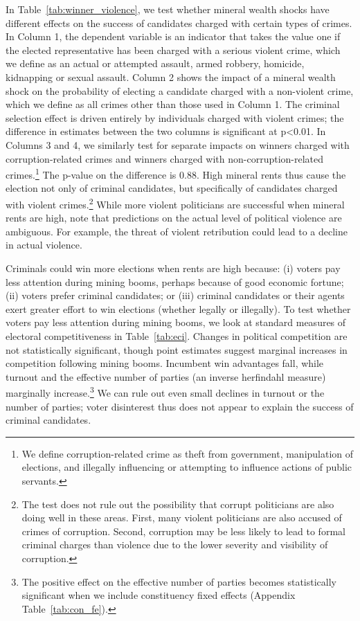 \documentclass[12pt,letterpaper]{article}
\begin{document}
In Table~\ref{tab:winner_violence}, we test whether mineral wealth
shocks have different effects on the success of candidates charged
with certain types of crimes. In Column 1, the dependent variable is
an indicator that takes the value one if the elected representative
has been charged with a serious violent crime, which we define as an
actual or attempted assault, armed robbery, homicide, kidnapping or
sexual assault. Column 2 shows the impact of a mineral wealth shock on
the probability of electing a candidate charged with a non-violent
crime, which we define as all crimes other than those used in Column
1. The criminal selection effect is driven entirely by individuals
charged with violent crimes; the difference in estimates between the
two columns is significant at p\textless 0.01. In Columns 3 and 4, we
similarly test for separate impacts on winners charged with
corruption-related crimes and winners charged with
non-corruption-related crimes.\footnote{We define corruption-related
  crime as theft from government, manipulation of elections, and
  illegally influencing or attempting to influence actions of public
  servants.} The p-value on the difference is 0.88. High mineral rents
thus cause the election not only of criminal candidates, but
specifically of candidates charged with violent crimes.\footnote{The
  test does not rule out the possibility that corrupt politicians are
  also doing well in these areas. First, many violent politicians are
  also accused of crimes of corruption. Second, corruption may be less
  likely to lead to formal criminal charges than violence due to the
  lower severity and visibility of corruption.} While more violent
politicians are successful when mineral rents are high, note that
predictions on the actual level of political violence are
ambiguous. For example, the threat of violent retribution could lead
to a decline in actual violence.

Criminals could win more elections when rents are high because: (i)
voters pay less attention during mining booms, perhaps because of good
economic fortune; (ii) voters prefer criminal candidates; or (iii)
criminal candidates or their agents exert greater effort to win
elections (whether legally or illegally).  To test whether voters pay
less attention during mining booms, we look at standard measures of
electoral competitiveness in Table~\ref{tab:eci}.  Changes in
political competition are not statistically significant, though point
estimates suggest marginal increases in competition following mining
booms. Incumbent win advantages fall, while turnout and the effective
number of parties (an inverse herfindahl measure) marginally
increase.\footnote{The positive effect on the effective number of
  parties becomes statistically significant when we include constituency
  fixed effects (Appendix Table~\ref{tab:con_fe}).}  We can rule out
even small declines in turnout or the number of parties; voter
disinterest thus does not appear to explain the success of criminal
candidates.
\end{document}
